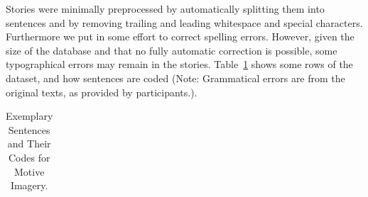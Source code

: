 \documentclass[jou,a4paper]{apa6}\usepackage[]{graphicx}\usepackage[]{color}
\begin{document}
Stories were minimally preprocessed by automatically splitting them into sentences and by removing trailing and leading whitespace and special characters. Furthermore we put in some effort to correct spelling errors. However, given the size of the database and that no fully automatic correction is possible, some typographical errors may remain in the stories. Table~\ref{tab:dathead} shows some rows of the dataset, and how sentences are coded (Note: Grammatical errors are from the original texts, as provided by participants.).


\begin{table}
		\caption{Exemplary Sentences and Their Codes for Motive Imagery.}
		\label{tab:dathead}
		\footnotesize
		\begin{tabularx}{\textwidth}{XXrrrl}
		\toprule
		

\end{tabularx}
\end{table}
\end{document}
